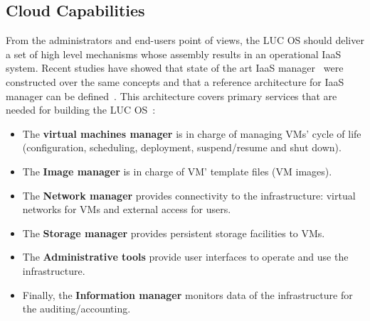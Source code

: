 
\subsection{Cloud Capabilities}

From the administrators and end-users point of views, the LUC OS should deliver a set of
high level mechanisms whose assembly results in an operational IaaS system. Recent studies
have showed that state of the art IaaS manager~\cite{peng:2009} were constructed over the
same concepts and that a reference architecture for IaaS manager can be
defined~\cite{moreno2012iaas}.
%
This architecture covers primary services that are needed for building
the LUC OS~:
\begin{itemize}
\item The \textbf{virtual machines manager} is in charge of managing VMs' cycle of life
(configuration, scheduling, deployment, suspend/resume and shut down).
\item The \textbf{Image
  manager} is in charge of VM' template files (\aka VM images).
\item The \textbf{Network
  manager} provides connectivity to the infrastructure: virtual networks for VMs and
external access for users.
\item The \textbf{Storage manager} provides persistent storage
facilities to VMs.
\item The \textbf{Administrative tools} provide user interfaces to operate
and use the infrastructure.
\item Finally, the \textbf{Information manager} monitors data of the
infrastructure for the auditing/accounting.
\end{itemize}

